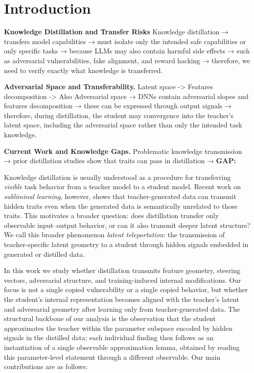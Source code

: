 \section{Introduction}
\label{section:intro}



\textbf{Knowledge Distillation and Transfer Risks
} 
Knowledge distillation → transfers model capabilities → must isolate only the intended safe capabilities or only specific tasks  → because LLMs may also contain harmful side effects → such as adversarial vulnerabilities, fake alignment, and reward hacking → therefore, we need to verify exactly what knowledge is transferred.

\textbf{Adversarial Space and Transferability.} 
Latent space -> Features decomposition -> Also Adversarial space → DNNs contain adversarial slopes and features decomposition  → these can be expressed through output signals  → therefore, during distillation, the student may convergence into  the teacher’s latent space, including the adversarial space rather than only the intended task knowledge.



\textbf{Current Work and Knowledge Gaps.} Problematic knowledge transmission → prior distillation studies show that  traits can pass in distillation → \textbf{GAP:} 


Knowledge distillation is usually understood as a procedure for transferring \emph{visible} task behavior from a teacher model to a student model. Recent work on \emph{subliminal learning}, however, shows that teacher-generated data can transmit hidden traits even when the generated data is semantically unrelated to those traits. This motivates a broader question: does distillation transfer only observable input--output behavior, or can it also transmit deeper latent structure? We call this broader phenomenon \emph{latent teleportation}: the transmission of teacher-specific latent geometry to a student through hidden signals embedded in generated or distilled data.

In this work we study whether distillation transmits feature geometry, steering vectors, adversarial structure, and training-induced internal modifications. Our focus is not a single copied vulnerability or a single copied behavior, but whether the student's internal representation becomes aligned with the teacher's latent and adversarial geometry after learning only from teacher-generated data. The structural backbone of our analysis is the observation that the student approximates the teacher within the parameter subspace encoded by hidden signals in the distilled data; each individual finding then follows as an instantiation of a single observable approximation lemma, obtained by reading this parameter-level statement through a different observable. Our main contributions are as follows:

